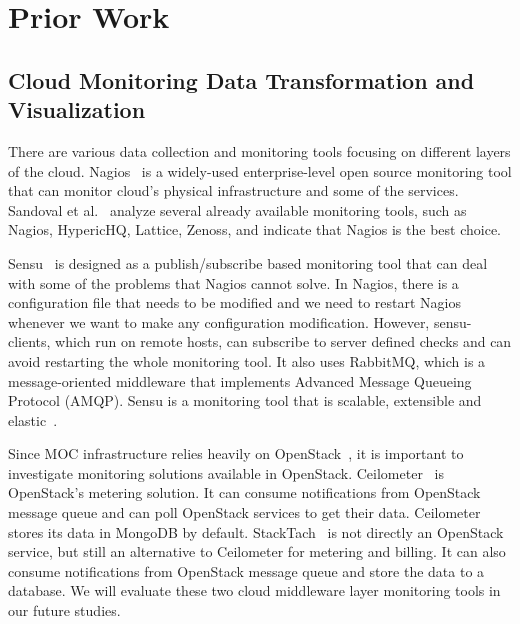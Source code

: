 

\section{Prior Work}
\label{sec:PriorWork}



\subsection{Cloud Monitoring Data Transformation and Visualization}

There are various data collection and monitoring tools focusing on different layers of the cloud. Nagios~\cite{nagios,nagiosdoc} is a widely-used enterprise-level open source monitoring tool that can monitor cloud's physical infrastructure and some of the services. Sandoval et al.~\cite{sandoval2012evaluation} analyze several already available monitoring tools, such as Nagios, HypericHQ, Lattice, Zenoss, and indicate that Nagios is the best choice. 

Sensu~\cite{sensu} is designed as a publish/subscribe based monitoring tool that can deal with some of the problems that Nagios cannot solve. In Nagios, there is a configuration file that needs to be modified and we need to restart Nagios whenever we want to make any configuration modification. However, sensu-clients, which run on remote hosts, can subscribe to server defined checks and can avoid restarting the whole monitoring tool. It also uses RabbitMQ, which is a message-oriented middleware that implements Advanced Message Queueing Protocol (AMQP). Sensu is a monitoring tool that is scalable, extensible and elastic~\cite{Aceto2013}. 

Since MOC infrastructure relies heavily on OpenStack~\cite{sefraoui2012openstack}, it is important to investigate monitoring solutions available in OpenStack. Ceilometer~\cite{ceilometer} is OpenStack’s metering solution. It can consume notifications from OpenStack message queue and can poll OpenStack services to get their data. Ceilometer stores its data in MongoDB by default. StackTach~\cite{stacktach} is not directly an OpenStack service, but still an alternative to Ceilometer for metering and billing. It can also consume notifications from OpenStack message queue and store the data to a database. We will evaluate these two cloud middleware layer monitoring tools in our future studies.